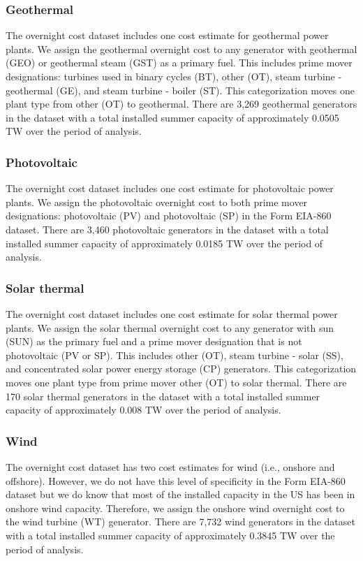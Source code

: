 \documentclass[10pt]{report}
\begin{document}
\subsubsection{Geothermal}
The overnight cost dataset includes one cost estimate for geothermal power plants. 
We assign the geothermal overnight cost to any generator with geothermal (GEO) or geothermal steam (GST) as a primary fuel. 
This includes prime mover designations: turbines used in binary cycles (BT), other (OT), steam turbine - geothermal (GE), and steam turbine - boiler (ST).  
This categorization moves one plant type from other (OT) to geothermal. 
There are 3,269 geothermal generators in the dataset with a total installed summer capacity of approximately 0.0505 TW over the period of analysis. 

\subsubsection{Photovoltaic}
The overnight cost dataset includes one cost estimate for photovoltaic power plants.
We assign the photovoltaic overnight cost to both prime mover designations: photovoltaic (PV) and photovoltaic (SP) in the Form EIA-860 dataset.
There are 3,460 photovoltaic generators in the dataset with a total installed summer capacity of approximately 0.0185 TW over the period of analysis. 

\subsubsection{Solar thermal}
The overnight cost dataset includes one cost estimate for solar thermal power plants. 
We assign the solar thermal overnight cost to any generator with sun (SUN) as the primary fuel and a prime mover designation that is not photovoltaic (PV or SP).
This includes other (OT), steam turbine - solar (SS), and concentrated solar power energy storage (CP) generators.
This categorization moves one plant type from prime mover other (OT) to solar thermal.   
There are 170 solar thermal generators in the dataset with a total installed summer capacity of approximately 0.008 TW over the period of analysis.

\subsubsection{Wind}
The overnight cost dataset has two cost estimates for wind (i.e., onshore and offshore).
However, we do not have this level of specificity in the Form EIA-860 dataset but we do know that most of the installed capacity in the US has been in onshore wind capacity. 
Therefore, we assign the onshore wind overnight cost to the wind turbine (WT) generator. 
There are 7,732 wind generators in the dataset with a total installed summer capacity of approximately 0.3845 TW over the period of analysis. 
\end{document}
